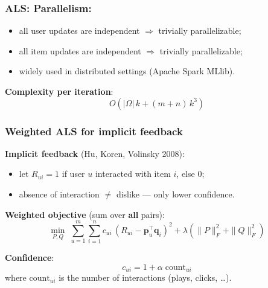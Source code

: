 \documentclass[]{beamer}
\begin{document}
\begin{frame}[fragile]
\frametitle{ALS: Parallelism:}
\begin{itemize}
  \item all user updates are independent $\Rightarrow$ trivially parallelizable;
  \item all item updates are independent $\Rightarrow$ trivially parallelizable;
  \item widely used in distributed settings (Apache Spark MLlib).
\end{itemize}

\textbf{Complexity per iteration}:
\begin{equation*}
O\!\left(|\Omega|\,k + (m + n)\,k^3\right)
\end{equation*}

\end{frame}

\begin{frame}[fragile]
\frametitle{Weighted ALS for implicit feedback}
\textbf{Implicit feedback} (Hu, Koren, Volinsky 2008):
\begin{itemize}
  \item let $R_{ui} = 1$ if user $u$ interacted with item $i$, else $0$;
  \item absence of interaction $\neq$ dislike --- only lower confidence.
\end{itemize}

\textbf{Weighted objective} (sum over \textbf{all} pairs):
\begin{equation*}
\min_{P,Q}\;\sum_{u=1}^{m}\sum_{i=1}^{n} c_{ui}\,(R_{ui} - \mathbf{p}_u^\top \mathbf{q}_i)^2
  + \lambda\!\left(\|P\|_F^2 + \|Q\|_F^2\right)
\end{equation*}

\textbf{Confidence}:
\begin{equation*}
c_{ui} = 1 + \alpha\;\mathrm{count}_{ui}
\end{equation*}
where $\mathrm{count}_{ui}$ is the number of interactions (plays, clicks, \dots).

\end{frame}
\end{document}
